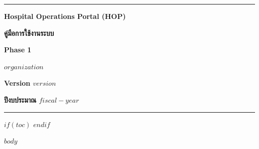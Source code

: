 \documentclass[16pt,a4paper]{extarticle}
\begin{document}
\begin{titlepage}
  \centering
  \vspace*{22mm}
  {\color{HopPrimary}\rule{0.86\textwidth}{2pt}\par}
  \vspace{14mm}
  {\fontsize{24pt}{30pt}\bfseries Hospital Operations Portal (HOP)\par}
  \vspace{8mm}
  {\fontsize{24pt}{30pt}\bfseries คู่มือการใช้งานระบบ\par}
  \vspace{8mm}
  {\fontsize{20pt}{26pt}\bfseries Phase 1\par}
  \vspace{18mm}
  {\fontsize{18pt}{24pt}\bfseries $organization$\par}
  \vfill
  {\fontsize{16pt}{22pt}\bfseries Version $version$\par}
  \vspace{3mm}
  {\fontsize{16pt}{22pt}\bfseries ปีงบประมาณ $fiscal-year$\par}
  \vspace{14mm}
  {\color{HopSecondary}\rule{0.86\textwidth}{1pt}\par}
\end{titlepage}

$if(toc)$
\tableofcontents
\newpage
$endif$

$body$
\end{document}
